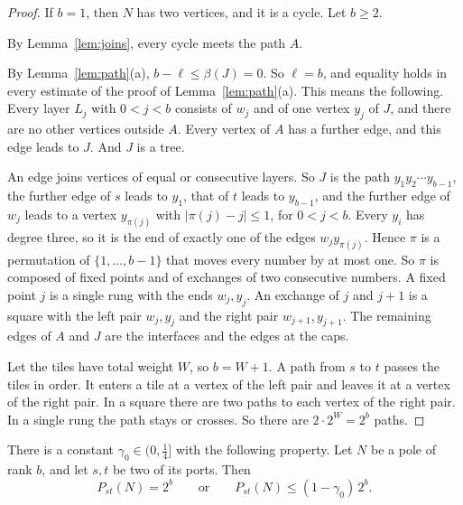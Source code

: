 \begin{proof}
If $b=1$, then $N$ has two vertices, and it is a cycle. Let $b\ge2$.

 By Lemma~\ref{lem:joins}, every cycle meets the path
$A$.

 By Lemma~\ref{lem:path}(a), $b-\ell\le\beta(J)=0$.
So $\ell=b$, and equality holds in every estimate of the proof of Lemma~\ref{lem:path}(a).
This means the following. Every layer $L_j$ with $0<j<b$ consists of $w_j$ and of one
vertex $y_j$ of $J$, and there are no other vertices outside $A$. Every vertex of $A$ has a
further edge, and this edge leads to $J$. And $J$ is a tree.

An edge joins vertices of equal or consecutive layers. So $J$ is the path
$y_1y_2\cdots y_{b-1}$, the further edge of $s$ leads to $y_1$, that of $t$ leads to $y_{b-1}$,
and the further edge of $w_j$ leads to a vertex $y_{\pi(j)}$ with $|\pi(j)-j|\le1$, for $0<j<b$.
Every $y_i$ has degree three, so it is the end of exactly one of the edges $w_jy_{\pi(j)}$. Hence
$\pi$ is a permutation of $\{1,\dots,b-1\}$ that moves every number by at most one. So $\pi$ is
composed of fixed points and of exchanges of two consecutive numbers. A fixed point $j$ is a
single rung with the ends $w_j,y_j$. An exchange of $j$ and $j+1$ is a square with the left pair
$w_j,y_j$ and the right pair $w_{j+1},y_{j+1}$. The remaining edges of $A$ and $J$ are the
interfaces and the edges at the caps.

 Let the tiles have total weight $W$, so $b=W+1$. A path
from $s$ to $t$ passes the tiles in order. It enters a tile at a vertex of the left pair and
leaves it at a vertex of the right pair. In a square there are two paths to each vertex of the
right pair. In a single rung the path stays or crosses. So there are $2\cdot2^{W}=2^{b}$ paths.
\end{proof}

\begin{theorem}[Gap]\label{thm:gap}
There is a constant $\gamma_0\in(0,\frac14]$ with the following property. Let $N$ be a pole of
rank $b$, and let $s,t$ be two of its ports. Then
\[
  P_{st}(N)=2^{b}\qquad\text{or}\qquad P_{st}(N)\le(1-\gamma_0)\,2^{b}.
\]
\end{theorem}

